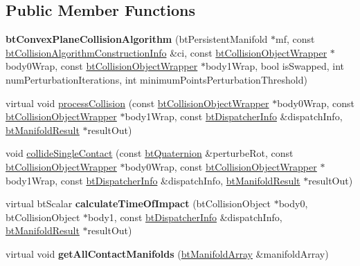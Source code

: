 \subsection*{Public Member Functions}
\begin{DoxyCompactItemize}
\item 
\hypertarget{classbt_convex_plane_collision_algorithm_a60f101519c99326f756d07e1218291ca}{{\bfseries bt\+Convex\+Plane\+Collision\+Algorithm} (bt\+Persistent\+Manifold $\ast$mf, const \hyperlink{structbt_collision_algorithm_construction_info}{bt\+Collision\+Algorithm\+Construction\+Info} \&ci, const \hyperlink{structbt_collision_object_wrapper}{bt\+Collision\+Object\+Wrapper} $\ast$body0\+Wrap, const \hyperlink{structbt_collision_object_wrapper}{bt\+Collision\+Object\+Wrapper} $\ast$body1\+Wrap, bool is\+Swapped, int num\+Perturbation\+Iterations, int minimum\+Points\+Perturbation\+Threshold)}\label{classbt_convex_plane_collision_algorithm_a60f101519c99326f756d07e1218291ca}

\item 
virtual void \hyperlink{classbt_convex_plane_collision_algorithm_ace95b966a346d00f7666549220f6afb8}{process\+Collision} (const \hyperlink{structbt_collision_object_wrapper}{bt\+Collision\+Object\+Wrapper} $\ast$body0\+Wrap, const \hyperlink{structbt_collision_object_wrapper}{bt\+Collision\+Object\+Wrapper} $\ast$body1\+Wrap, const \hyperlink{structbt_dispatcher_info}{bt\+Dispatcher\+Info} \&dispatch\+Info, \hyperlink{classbt_manifold_result}{bt\+Manifold\+Result} $\ast$result\+Out)
\item 
void \hyperlink{classbt_convex_plane_collision_algorithm_a79f8384fcdc2145be9fca0057edc8b69}{collide\+Single\+Contact} (const \hyperlink{classbt_quaternion}{bt\+Quaternion} \&perturbe\+Rot, const \hyperlink{structbt_collision_object_wrapper}{bt\+Collision\+Object\+Wrapper} $\ast$body0\+Wrap, const \hyperlink{structbt_collision_object_wrapper}{bt\+Collision\+Object\+Wrapper} $\ast$body1\+Wrap, const \hyperlink{structbt_dispatcher_info}{bt\+Dispatcher\+Info} \&dispatch\+Info, \hyperlink{classbt_manifold_result}{bt\+Manifold\+Result} $\ast$result\+Out)
\item 
\hypertarget{classbt_convex_plane_collision_algorithm_ad72bfddcee82521487ca61227d6d2073}{virtual bt\+Scalar {\bfseries calculate\+Time\+Of\+Impact} (bt\+Collision\+Object $\ast$body0, bt\+Collision\+Object $\ast$body1, const \hyperlink{structbt_dispatcher_info}{bt\+Dispatcher\+Info} \&dispatch\+Info, \hyperlink{classbt_manifold_result}{bt\+Manifold\+Result} $\ast$result\+Out)}\label{classbt_convex_plane_collision_algorithm_ad72bfddcee82521487ca61227d6d2073}

\item 
\hypertarget{classbt_convex_plane_collision_algorithm_a9c5fc2f47f528052d57c2d2158f5e05e}{virtual void {\bfseries get\+All\+Contact\+Manifolds} (\hyperlink{classbt_aligned_object_array}{bt\+Manifold\+Array} \&manifold\+Array)}\label{classbt_convex_plane_collision_algorithm_a9c5fc2f47f528052d57c2d2158f5e05e}

\end{DoxyCompactItemize}
